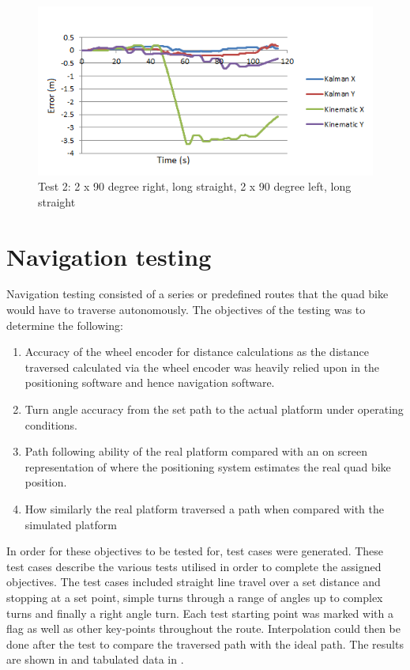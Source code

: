 \documentclass[main.tex]{subfiles}
\begin{document}
\begin{figure}[ht]
\includegraphics[width=\textwidth]{5-Testing/position_error_test_2.png}
\centering
\caption[Positioning system test 2]{Test 2: 2 x 90 degree right, long straight, 2 x 90 degree left, long straight} 
\end{figure}

\section{Navigation testing}
Navigation testing consisted of a series or predefined routes that the quad bike would have to traverse autonomously. The objectives of the testing was to determine the following:

\begin{enumerate}
\item Accuracy of the wheel encoder for distance calculations as the distance traversed calculated via the wheel encoder was heavily relied upon in the positioning software and hence navigation software.
\item Turn angle accuracy from the set path to the actual platform under operating conditions. 
\item Path following ability of the real platform compared with an on screen representation of where the positioning system estimates the real quad bike position.
\item How similarly the real platform traversed a path when compared with the simulated platform
\end{enumerate}

In order for these objectives to be tested for, test cases were generated. These test cases describe the various tests utilised in order to complete the assigned objectives. The test cases included straight line travel over a set distance and stopping at a set point, simple turns through a range of angles up to complex turns and finally a right angle turn. Each test starting point was marked with a flag as well as other key-points throughout the route. Interpolation could then be done after the test to compare the traversed path with the ideal path. The results are shown in  and tabulated data in .
\end{document}
